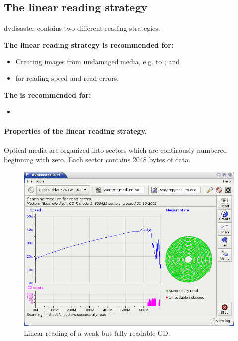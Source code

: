 \subsection{The linear reading strategy}
\label{background-linear}

dvdisaster contains two different reading strategies.

\medskip

{\bf The linear reading strategy is recommended for:}

\begin{itemize}
\item Creating images from undamaged media,
  e.g. to ; and
\item {} for reading speed and read errors.
\end{itemize}

\medskip

{\bf The}  {\bf is recommended for:}

\begin{itemize}
\item {}
\end{itemize}

\paragraph{Properties of the linear reading strategy.}\quad

\medskip

Optical media are
organized into sectors which are continously numbered beginning with zero.
Each sector contains 2048 bytes of data.

\begin{figure}
\centerline{\includegraphics[width=1.0\textwidth]{screenshots/weak-cd-scan.png}}
\caption{Linear reading of a weak but fully readable CD.}  
\label{background-linear-weak-scan}
\end{figure}

